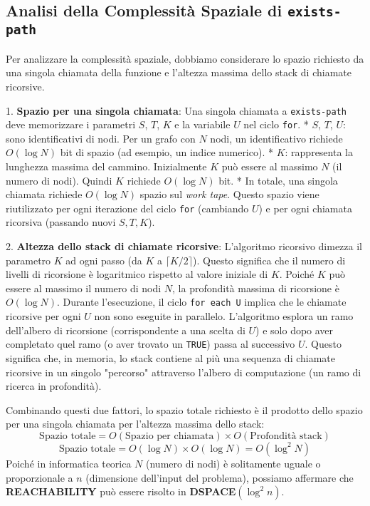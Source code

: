 \documentclass[a4paper]{article}
\begin{document}
\subsection{Analisi della Complessità Spaziale di \texttt{exists-path}}
Per analizzare la complessità spaziale, dobbiamo considerare lo spazio richiesto da una singola chiamata della funzione e l'altezza massima dello stack di chiamate ricorsive.

1.  \textbf{Spazio per una singola chiamata}:
    Una singola chiamata a \texttt{exists-path} deve memorizzare i parametri $S$, $T$, $K$ e la variabile $U$ nel ciclo \texttt{for}.
    *   $S$, $T$, $U$: sono identificativi di nodi. Per un grafo con $N$ nodi, un identificativo richiede $O(\log N)$ bit di spazio (ad esempio, un indice numerico).
    *   $K$: rappresenta la lunghezza massima del cammino. Inizialmente $K$ può essere al massimo $N$ (il numero di nodi). Quindi $K$ richiede $O(\log N)$ bit.
    *   In totale, una singola chiamata richiede $O(\log N)$ spazio sul \emph{work tape}. Questo spazio viene riutilizzato per ogni iterazione del ciclo \texttt{for} (cambiando $U$) e per ogni chiamata ricorsiva (passando nuovi $S, T, K$).

2.  \textbf{Altezza dello stack di chiamate ricorsive}:
    L'algoritmo ricorsivo dimezza il parametro $K$ ad ogni passo (da $K$ a $\lceil K/2 \rceil$). Questo significa che il numero di livelli di ricorsione è logaritmico rispetto al valore iniziale di $K$. Poiché $K$ può essere al massimo il numero di nodi $N$, la profondità massima di ricorsione è $O(\log N)$.
    Durante l'esecuzione, il ciclo \texttt{for each U} implica che le chiamate ricorsive per ogni $U$ non sono eseguite in parallelo. L'algoritmo esplora un ramo dell'albero di ricorsione (corrispondente a una scelta di $U$) e solo dopo aver completato quel ramo (o aver trovato un \texttt{TRUE}) passa al successivo $U$. Questo significa che, in memoria, lo stack contiene al più una sequenza di chiamate ricorsive in un singolo "percorso" attraverso l'albero di computazione (un ramo di ricerca in profondità).

Combinando questi due fattori, lo spazio totale richiesto è il prodotto dello spazio per una singola chiamata per l'altezza massima dello stack:
\[ \text{Spazio totale} = O(\text{Spazio per chiamata}) \times O(\text{Profondità stack}) \]
\[ \text{Spazio totale} = O(\log N) \times O(\log N) = O(\log^2 N) \]
Poiché in informatica teorica $N$ (numero di nodi) è solitamente uguale o proporzionale a $n$ (dimensione dell'input del problema), possiamo affermare che \textbf{REACHABILITY} può essere risolto in \textbf{DSPACE}$(\log^2 n)$.
\end{document}
